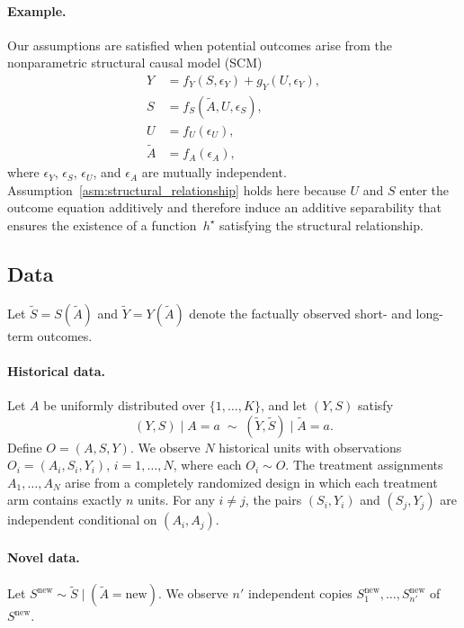 \documentclass[11pt]{article}
\newcommand{\new}{\mathrm{new}}
\theoremstyle{plain}
\theoremstyle{definition}
\theoremstyle{remark}
\theoremstyle{definition}
\begin{document}
\paragraph{Example.}
Our assumptions are satisfied when potential outcomes arise from the nonparametric structural causal model (SCM)
\begin{align*}
Y &= f_Y(S, \epsilon_Y) + g_Y(U, \epsilon_Y),\\
S &= f_{S}(\widetilde A, U, \epsilon_{S}),\\
U &= f_{U}(\epsilon_{U}),\\
\widetilde A &= f_{A}(\epsilon_{A}),
\end{align*}
where $\epsilon_Y$, $\epsilon_S$, $\epsilon_U$, and $\epsilon_A$ are mutually independent. Assumption~\ref{asm:structural_relationship} holds here because $U$ and $S$ enter the outcome equation additively and therefore induce an additive separability that ensures the existence of a function~$h^\star$ satisfying the structural relationship.

\subsection{Data}

Let $\widetilde S = S(\widetilde A)$ and $\widetilde Y = Y(\widetilde A)$ denote the factually observed short- and long-term outcomes.

\paragraph{Historical data.}
Let $A$ be uniformly distributed over $\{1,\ldots,K\}$, and let $(Y,S)$ satisfy
\[
(Y,S) \mid A = a \;\sim\; (\widetilde Y, \widetilde S) \mid \widetilde A = a.
\]
Define $O = (A,S,Y)$. We observe $N$ historical units with observations $O_i = (A_i, S_i, Y_i)$, $i=1,\ldots,N$, where each $O_i \sim O$. The treatment assignments $A_1,\ldots,A_N$ arise from a completely randomized design in which each treatment arm contains exactly $n$ units. For any $i \neq j$, the pairs $(S_i,Y_i)$ and $(S_j,Y_j)$ are independent conditional on $(A_i, A_j)$.

\paragraph{Novel data.}
Let $S^{\new} \sim \widetilde S \mid (\widetilde A = \new)$. We observe $n'$ independent copies $S^{\new}_1,\ldots,S^{\new}_{n'}$ of $S^{\new}$.
\end{document}
